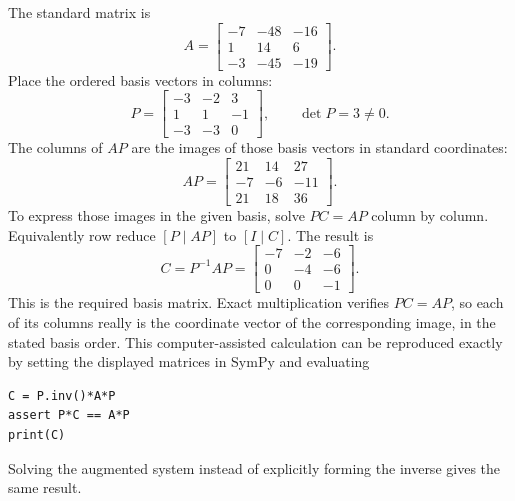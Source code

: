 The standard matrix is
\[A=\begin{bmatrix}-7&-48&-16\\1&14&6\\-3&-45&-19\end{bmatrix}.\]
Place the ordered basis vectors in columns:
\[P=\begin{bmatrix}-3&-2&3\\1&1&-1\\-3&-3&0\end{bmatrix},\qquad\det P=3\ne0.\]
The columns of $AP$ are the images of those basis vectors in standard coordinates:
\[AP=\begin{bmatrix}21&14&27\\-7&-6&-11\\21&18&36\end{bmatrix}.\]
To express those images in the given basis, solve $PC=AP$ column by column. Equivalently row reduce $[P\mid AP]$ to $[I\mid C]$. The result is
\[C=P^{-1}AP=\begin{bmatrix}-7&-2&-6\\0&-4&-6\\0&0&-1\end{bmatrix}.\]
This is the required basis matrix. Exact multiplication verifies $PC=AP$, so each of its columns really is the coordinate vector of the corresponding image, in the stated basis order.
This computer-assisted calculation can be reproduced exactly by setting the displayed matrices in SymPy and evaluating
\begin{verbatim}
C = P.inv()*A*P
assert P*C == A*P
print(C)
\end{verbatim}
Solving the augmented system instead of explicitly forming the inverse gives the same result.

